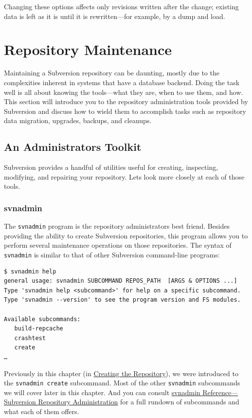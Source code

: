 Changing these options affects only revisions written after the change;
existing data is left as it is until it is rewritten---for example, by a
dump and load.

\section{Repository Maintenance}\label{svn.reposadmin.maint}

Maintaining a Subversion repository can be daunting, mostly due to the
complexities inherent in systems that have a database backend. Doing the
task well is all about knowing the tools---what they are, when to use
them, and how. This section will introduce you to the repository
administration tools provided by Subversion and discuss how to wield
them to accomplish tasks such as repository data migration, upgrades,
backups, and cleanups.

\subsection{An Administrator\textquotesingle s
Toolkit}\label{svn.reposadmin.maint.tk}

Subversion provides a handful of utilities useful for creating,
inspecting, modifying, and repairing your repository.
Let\textquotesingle s look more closely at each of those tools.

\subsubsection{svnadmin}\label{svn.reposadmin.maint.tk.svnadmin}

The \texttt{svnadmin} program is the repository
administrator\textquotesingle s best friend. Besides providing the
ability to create Subversion repositories, this program allows you to
perform several maintenance operations on those repositories. The syntax
of \texttt{svnadmin} is similar to that of other Subversion command-line
programs:

\begin{verbatim}
$ svnadmin help
general usage: svnadmin SUBCOMMAND REPOS_PATH  [ARGS & OPTIONS ...]
Type 'svnadmin help <subcommand>' for help on a specific subcommand.
Type 'svnadmin --version' to see the program version and FS modules.

Available subcommands:
   build-repcache
   crashtest
   create
…
\end{verbatim}

Previously in this chapter (in
\hyperref[svn.reposadmin.basics.creating]{Creating the Repository}), we
were introduced to the \texttt{svnadmin\ create} subcommand. Most of the
other \texttt{svnadmin} subcommands we will cover later in this chapter.
And you can consult \hyperref[svn.ref.svnadmin]{svnadmin
Reference---Subversion Repository Administration} for a full rundown of
subcommands and what each of them offers.


